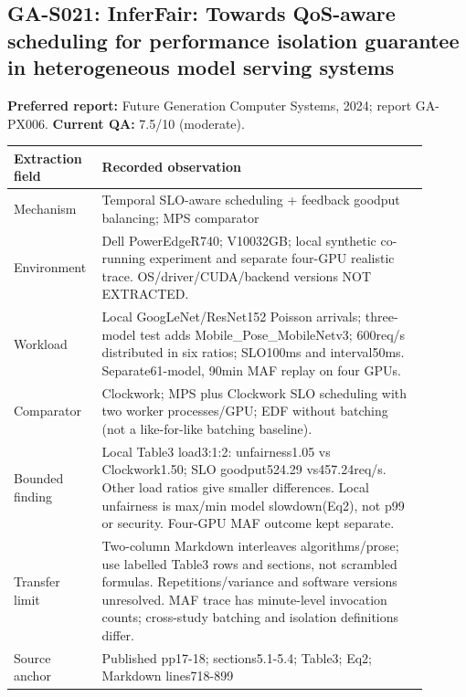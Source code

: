\subsection{GA-S021: InferFair: Towards QoS-aware scheduling for performance isolation guarantee in heterogeneous model serving systems}
\textbf{Preferred report:} Future Generation Computer Systems, 2024; report GA-PX006. \textbf{Current QA:} 7.5/10 (moderate).
\begin{longtable}{P{0.15\linewidth}P{0.75\linewidth}}
\toprule Extraction field & Recorded observation\\\midrule\endhead
Mechanism & Temporal SLO-aware scheduling + feedback goodput balancing; MPS comparator\\
Environment & Dell PowerEdgeR740; V10032GB; local synthetic co-running experiment and separate four-GPU realistic trace. OS/driver/CUDA/backend versions NOT EXTRACTED.\\
Workload & Local GoogLeNet/ResNet152 Poisson arrivals; three-model test adds Mobile\_Pose\_MobileNetv3; 600req/s distributed in six ratios; SLO100ms and interval50ms. Separate61-model, 90min MAF replay on four GPUs.\\
Comparator & Clockwork; MPS plus Clockwork SLO scheduling with two worker processes/GPU; EDF without batching (not a like-for-like batching baseline).\\
Bounded finding & Local Table3 load3:1:2: unfairness1.05 vs Clockwork1.50; SLO goodput524.29 vs457.24req/s. Other load ratios give smaller differences. Local unfairness is max/min model slowdown(Eq2), not p99 or security. Four-GPU MAF outcome kept separate.\\
Transfer limit & Two-column Markdown interleaves algorithms/prose; use labelled Table3 rows and sections, not scrambled formulas. Repetitions/variance and software versions unresolved. MAF trace has minute-level invocation counts; cross-study batching and isolation definitions differ.\\
Source anchor & Published pp17-18; sections5.1-5.4; Table3; Eq2; Markdown lines718-899\\
\bottomrule\end{longtable}
